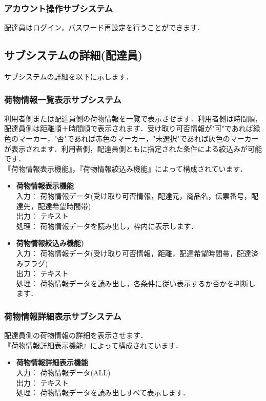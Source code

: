 \documentclass[a4j,titlepage]{jarticle}
\begin{document}
\subsubsection{アカウント操作サブシステム}
配達員はログイン，パスワード再設定を行うことができます．

\subsection{サブシステムの詳細(配達員)}
サブシステムの詳細を以下に示します．

\subsubsection{荷物情報一覧表示サブシステム}
利用者側または配達員側の荷物情報を一覧で表示させます．利用者側は時間順，配達員側は距離順＋時間順で表示されます．受け取り可否情報が"可"であれば緑色のマーカー，"否"であれば赤色のマーカー，"未選択"であれば灰色のマーカーが表示されます．利用者側，配達員側ともに指定された条件による絞込みが可能です．\\
『荷物情報表示機能』，『荷物情報絞込み機能』によって構成されています．
\begin{itemize}
\item \textbf{荷物情報表示機能} \\
入力： 荷物情報データ(受け取り可否情報，配達元，商品名，伝票番号，配達先，配達希望時間帯) \\
出力： テキスト \\
処理： 荷物情報データを読み出し，枠内に表示します．
\item \textbf{荷物情報絞込み機能)} \\
入力： 荷物情報データ(受け取り可否情報，距離，配達希望時間帯，配達済みフラグ) \\
出力： テキスト \\
処理： 荷物情報データを読み出し，各条件に従い表示するか否かを判断します．
\end{itemize}

\subsubsection{荷物情報詳細表示サブシステム}
配達員側の荷物情報の詳細を表示させます．\\
『荷物情報詳細表示機能』によって構成されています．
\begin{itemize}
\item \textbf{荷物情報詳細表示機能} \\
入力： 荷物情報データ(ALL) \\
出力： テキスト \\
処理： 荷物情報データを読み出しすべて表示します．
\end{itemize}
\end{document}
